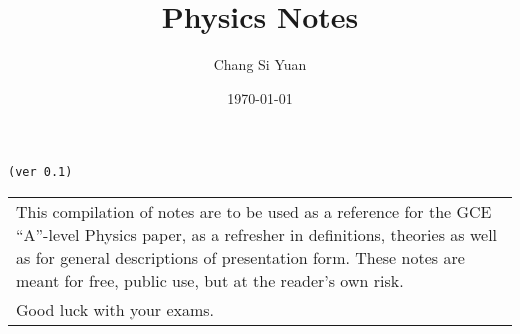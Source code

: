 \documentclass[../main]{subfiles}
\begin{document}
\author{Chang Si Yuan}
\title{Physics Notes}
\date{\today}

\maketitle

\begin{center}

	\texttt{(ver 0.1)}

	\vspace{50pt}

	\begin{tabular}{>{\flushleft}p{8cm}}
	This compilation of notes are to be used as a reference for the GCE ``A''-level Physics paper, as a refresher in definitions, theories as well as for general descriptions of presentation form. These notes are meant for free, public use, but at the reader's own risk. \\
	Good luck with your exams.
	\end{tabular}

	\vspace{50pt}

\end{center}

\newpage
\end{document}
